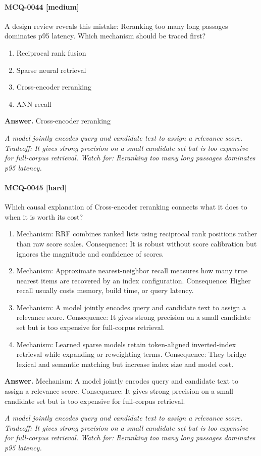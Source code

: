 \paragraph{MCQ-0044 [medium]} A design review reveals this mistake: Reranking too many long passages dominates p95 latency. Which mechanism should be traced first?
\begin{enumerate}[label=\Alph*.]
\item Reciprocal rank fusion
\item Sparse neural retrieval
\item Cross-encoder reranking
\item ANN recall
\end{enumerate}
\noindent\textbf{Answer.} Cross-encoder reranking
\par\textit{A model jointly encodes query and candidate text to assign a relevance score. Tradeoff: It gives strong precision on a small candidate set but is too expensive for full-corpus retrieval. Watch for: Reranking too many long passages dominates p95 latency.}
\paragraph{MCQ-0045 [hard]} Which causal explanation of Cross-encoder reranking connects what it does to when it is worth its cost?
\begin{enumerate}[label=\Alph*.]
\item Mechanism: RRF combines ranked lists using reciprocal rank positions rather than raw score scales. Consequence: It is robust without score calibration but ignores the magnitude and confidence of scores.
\item Mechanism: Approximate nearest-neighbor recall measures how many true nearest items are recovered by an index configuration. Consequence: Higher recall usually costs memory, build time, or query latency.
\item Mechanism: A model jointly encodes query and candidate text to assign a relevance score. Consequence: It gives strong precision on a small candidate set but is too expensive for full-corpus retrieval.
\item Mechanism: Learned sparse models retain token-aligned inverted-index retrieval while expanding or reweighting terms. Consequence: They bridge lexical and semantic matching but increase index size and model cost.
\end{enumerate}
\noindent\textbf{Answer.} Mechanism: A model jointly encodes query and candidate text to assign a relevance score. Consequence: It gives strong precision on a small candidate set but is too expensive for full-corpus retrieval.
\par\textit{A model jointly encodes query and candidate text to assign a relevance score. Tradeoff: It gives strong precision on a small candidate set but is too expensive for full-corpus retrieval. Watch for: Reranking too many long passages dominates p95 latency.}
